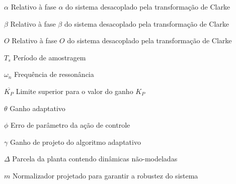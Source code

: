 \documentclass[12pt,
              openright,
              twoside,
              a4paper,
              english,
              french,
              spanish,
              sumario=tradicional,
              brazil
              ]{abntex2}
\begin{document}
\begin{simbolos}
 \item[$ \alpha $] Relativo à fase $\alpha$ do sistema desacoplado pela transformação de Clarke
 \item[$ \beta $] Relativo à fase $\beta$ do sistema desacoplado pela transformação de Clarke
 \item[$ O $] Relativo à fase $O$ do sistema desacoplado pela transformação de Clarke
 \item[$ T_s $] Período de amostragem
 \item[$ \omega_n $] Frequência de ressonância
 \item[$ \overline{K_P} $] Limite superior para o valor do ganho $K_P$
 \item[$ \theta $] Ganho adaptativo
 \item[$ \phi $] Erro de parâmetro da ação de controle
 \item[$ \gamma $] Ganho de projeto do algoritmo adaptativo
 \item[$ \Delta $] Parcela da planta contendo dinâmicas não-modeladas
 \item[$ m $] Normalizador projetado para garantir a robustez do sistema
\end{simbolos}

\tableofcontents*
\cleardoublepage



\textual





\end{document}
